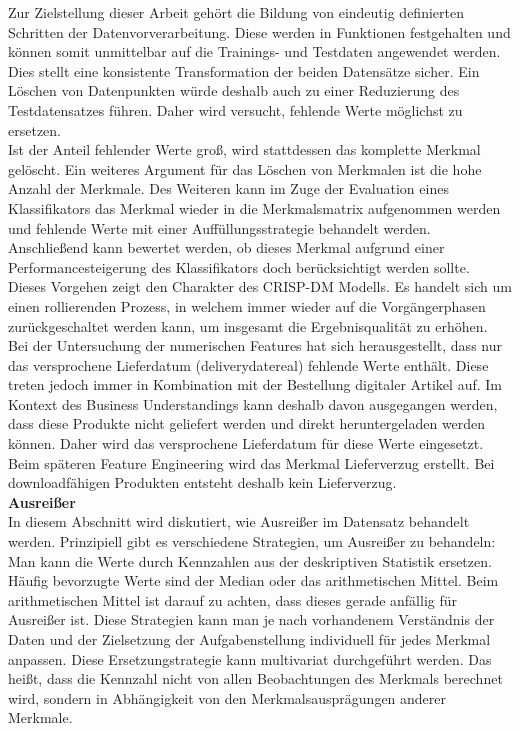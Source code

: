 Zur Zielstellung dieser Arbeit gehört die Bildung von eindeutig definierten Schritten der Datenvorverarbeitung. Diese werden in Funktionen festgehalten und können somit unmittelbar auf die Trainings- und Testdaten angewendet werden. Dies stellt eine konsistente Transformation der beiden Datensätze sicher. Ein Löschen von Datenpunkten würde deshalb auch zu einer Reduzierung des Testdatensatzes führen. Daher wird versucht, fehlende Werte möglichst zu ersetzen.\\ 

Ist der Anteil fehlender Werte groß, wird stattdessen das komplette Merkmal gelöscht. Ein weiteres Argument für das Löschen von Merkmalen ist die hohe Anzahl der Merkmale. Des Weiteren kann im Zuge der Evaluation eines Klassifikators das Merkmal wieder in die Merkmalsmatrix aufgenommen werden und fehlende Werte mit einer Auffüllungsstrategie behandelt werden. Anschließend kann bewertet werden, ob dieses Merkmal aufgrund einer Performancesteigerung des Klassifikators doch berücksichtigt werden sollte. Dieses Vorgehen zeigt den Charakter des CRISP-DM Modells. Es handelt sich um einen rollierenden Prozess, in welchem immer wieder auf die Vorgängerphasen zurückgeschaltet werden kann, um insgesamt die Ergebnisqualität zu erhöhen.\\

Bei der Untersuchung der numerischen Features hat sich herausgestellt, dass nur das versprochene Lieferdatum (deliverydatereal) fehlende Werte enthält. Diese treten jedoch immer in Kombination mit der Bestellung digitaler Artikel auf. Im Kontext des Business Understandings kann deshalb davon ausgegangen werden, dass diese Produkte nicht geliefert werden und direkt heruntergeladen werden können. Daher wird das versprochene Lieferdatum für diese Werte eingesetzt. Beim späteren Feature Engineering wird das Merkmal Lieferverzug erstellt. Bei downloadfähigen Produkten entsteht deshalb kein Lieferverzug.\\ 

\textbf{Ausreißer}\\

In diesem Abschnitt wird diskutiert, wie Ausreißer im Datensatz behandelt werden. Prinzipiell gibt es verschiedene Strategien, um Ausreißer zu behandeln: Man kann die Werte durch Kennzahlen aus der deskriptiven Statistik ersetzen. Häufig bevorzugte Werte sind der Median oder das arithmetischen Mittel. Beim arithmetischen Mittel ist darauf zu achten, dass dieses gerade anfällig für Ausreißer ist. Diese Strategien kann man je nach vorhandenem Verständnis der Daten und der Zielsetzung der Aufgabenstellung individuell für jedes Merkmal anpassen. Diese Ersetzungstrategie kann multivariat durchgeführt werden. Das heißt, dass  die Kennzahl nicht von allen Beobachtungen des Merkmals berechnet wird, sondern in Abhängigkeit von den Merkmalsausprägungen anderer Merkmale.\\

